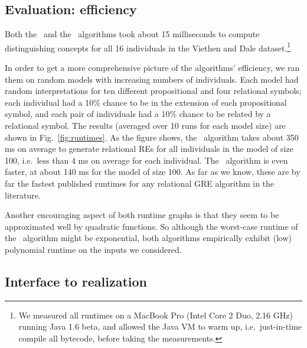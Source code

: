 \subsection{Evaluation: efficiency}

Both the \el\ and the \alc\ algorithms took about 15 milliseconds to
compute distinguishing concepts for all 16 individuals in the Viethen
and Dale dataset.\footnote{We measured all runtimes on a MacBook Pro
  (Intel Core 2 Duo, 2.16 GHz) running Java 1.6 beta, and allowed the
  Java VM to warm up, i.e.\ just-in-time compile all bytecode, before
  taking the measurements.}

In order to get a more comprehensive picture of the algorithms'
efficiency, we ran them on random models with increasing numbers of
individuals.  Each model had random interpretations for ten different
propositional and four relational symbols; each individual had a 10\%
chance to be in the extension of each propositional symbol, and each
pair of individuals had a 10\% chance to be related by a relational
symbol.  The results (averaged over 10 runs for each model size) are
shown in Fig.~\ref{fig:runtimes}.  As the figure shows, the \el\
algorithm takes about 350 ms on average to generate relational REs for
all individuals in the model of size 100, i.e.\ less than 4 ms on
average for each individual.  The \alc\ algorithm is even faster, at
about 140 ms for the model of size 100.  As far as we know, these are
by far the fastest published runtimes for any relational GRE algorithm
in the literature.

Another encouraging aspect of both runtime graphs is that they seem to
be approximated well by quadratic functions.  So although the
worst-case runtime of the \el\ algorithm might be exponential, both
algorithms empirically exhibit (low) polynomial runtime on the inputs
we considered.



\subsection{Interface to realization}
\label{sec:discussion-realization}


